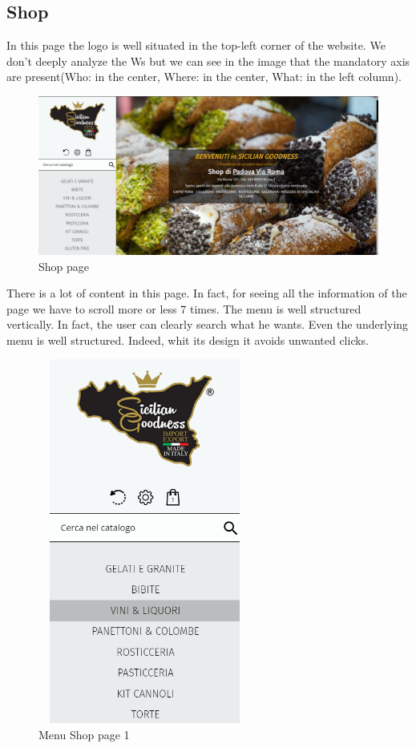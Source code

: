 \subsection{Shop}
In this page the logo is well situated in the top-left corner of the website.
We don't deeply analyze the Ws but we can see in the image that the mandatory axis are present(Who: in the center, Where: in the center, What: in the left column).

\begin{figure}[H]
	\centering\includegraphics[width=12cm]{Img/Shop.png}
	\caption{Shop page}
\end{figure}

There is a lot of content in this page. In fact, for seeing all the information of the page we have to scroll more or less 7 times.
\newline
The menu is well structured vertically. In fact, the user can clearly search what he wants. 
Even the underlying menu is well structured. Indeed, whit its design it avoids unwanted clicks.

\begin{figure}[H]
	\centering\includegraphics[height=12cm, width=7cm]{Img/menushop1.png}
	\caption{Menu Shop page 1}
\end{figure}

